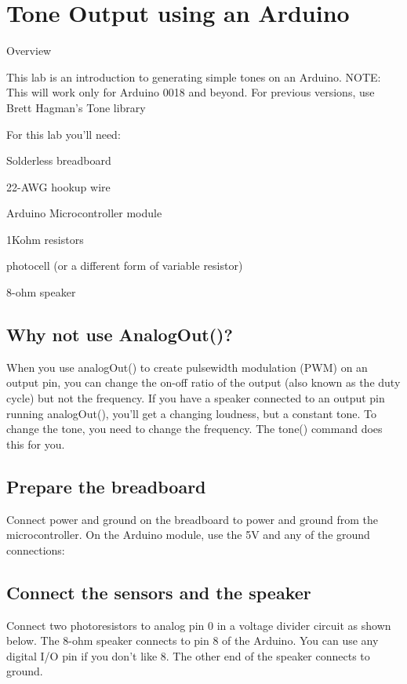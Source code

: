 \chapter{Tone Output using an Arduino}

Overview

This lab is an introduction to generating simple tones on an Arduino. NOTE: This will work only for Arduino 0018 and beyond. For previous versions, use Brett Hagman's Tone library

For this lab you'll need:

Solderless breadboard

22-AWG hookup wire

Arduino Microcontroller 
module


1Kohm resistors

photocell
(or a different
form of variable resistor)
 
8-ohm speaker

\section{Why not use AnalogOut()?}

When you use analogOut() to create pulsewidth modulation (PWM) on an output pin, you can change the on-off ratio of the output (also known as the duty cycle) but not the frequency. If you have a speaker connected to an output pin running analogOut(), you'll get a changing loudness, but a constant tone. To change the tone, you need to change the frequency. The tone() command does this for you.

\section{Prepare the breadboard}

Connect power and ground on the breadboard to power and ground from the microcontroller. On the Arduino module, use the 5V and any of the ground connections:


\section{Connect the sensors and the speaker}

Connect two photoresistors to analog pin 0 in a voltage divider circuit as shown below. The 8-ohm speaker connects to pin 8 of the Arduino. You can use any digital I/O pin if you don't like 8. The other end of the speaker connects to ground.


